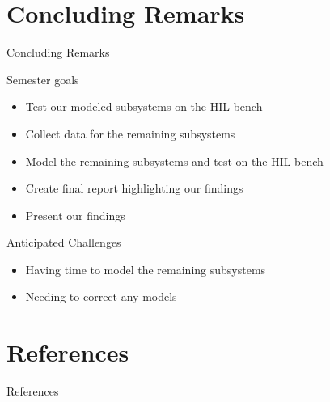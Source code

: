 \documentclass{beamer}
\begin{document}


\section{Concluding Remarks}
\begin{frame}{Concluding Remarks}
  \begin{block}{Semester goals}
      \begin{itemize}
        \item Test our modeled subsystems on the HIL bench
        \item Collect data for the remaining subsystems
        \item Model the remaining subsystems and test on the HIL bench
        \item Create final report highlighting our findings
        \item Present our findings
      \end{itemize}
  \end{block}
  \begin{block}{Anticipated Challenges}
      \begin{itemize}
      	\item Having time to model the remaining subsystems
      	\item Needing to correct any models
      \end{itemize}
  \end{block}
\end{frame}


\section{References}
\begin{frame}[allowframebreaks]{References}

  
  

\end{frame}
\end{document}
